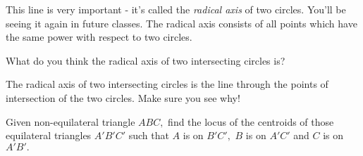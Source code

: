 \begin{note}
    This line is very important - it's called the \emph{radical axis} of two circles. You'll be seeing it again in future classes. The radical axis consists of all points which have the same power with respect to two circles.    
\end{note}

What do you think the radical axis of two intersecting circles is?













The radical axis of two intersecting circles is the line through the points of intersection of the two circles. Make sure you see why!

\vspace{10pt}
\begin{example}
    Given non-equilateral triangle $ABC,$ find the locus of the centroids of those equilateral triangles $A'B'C'$ such that $A$ is on $B'C',$ $B$ is on $A'C'$ and $C$ is on $A'B'.$ 
\end{example}

